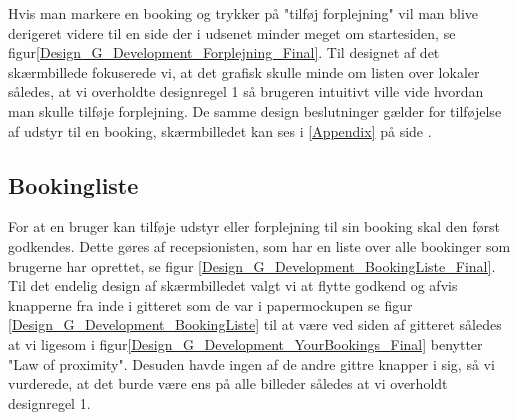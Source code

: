 Hvis man markere en booking og trykker på "tilføj forplejning" vil man blive derigeret videre til en side der i udsenet minder meget om startesiden, se figur\ref{Design_G_Development_Forplejning_Final}. Til designet af det skærmbillede fokuserede vi, at det grafisk skulle minde om listen over lokaler således, at vi overholdte designregel 1 så brugeren intuitivt ville vide hvordan man skulle tilføje forplejning. De samme design beslutninger gælder for tilføjelse af udstyr til en booking, skærmbilledet kan ses i  \ref{Appendix} på side \pageref{Appendix}.

\subsection{Bookingliste}
For at en bruger kan tilføje udstyr eller forplejning til sin booking skal den først godkendes. Dette gøres af recepsionisten, som har en liste over alle bookinger som brugerne har oprettet, se figur \ref{Design_G_Development_BookingListe_Final}. Til det endelig design af skærmbilledet valgt vi at flytte godkend og afvis knapperne fra inde i gitteret som de var i papermockupen se figur \ref{Design_G_Development_BookingListe} til at være ved siden af gitteret således at vi ligesom i figur\ref{Design_G_Development_YourBookings_Final} benytter "Law of proximity". Desuden havde ingen af de andre gittre knapper i sig, så vi vurderede, at det burde være ens på alle billeder således at vi overholdt designregel 1.

